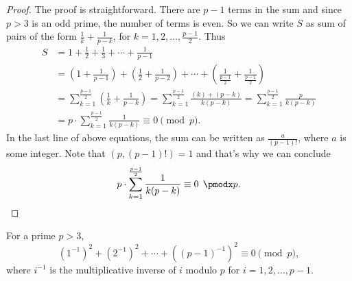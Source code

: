 \documentclass[12pt]{subfile}
\begin{document}
		\begin{proof}
			The proof is straightforward. There are $p-1$ terms in the sum and since $p>3$ is an odd prime, the number of terms is even. So we can write $S$ as sum of pairs of the form $ \frac{1}{k} +‌\frac{1}{p-k}$, for $k=1, 2, \ldots, \frac{p-1}{2}$. Thus
			\begin{align*}
				S &= 1+\frac{1}{2}+ \frac{1}{3}+\cdots+ \frac{1}{p-1}\\
				&= \left(1 + \frac{1}{p-1}\right) +‌\left(\frac{1}{2} + \frac{1}{p-2}\right) + \cdots + \left(\frac{1}{\frac{p-1}{2}} + \frac{1}{\frac{p-1}{2}}\right)\\
				&= \sum_{k=1}^{\frac{p-1}{2}} \left(\frac{1}{k}+\frac{1}{p-k} \right) = \sum_{k=1}^{\frac{p-1}{2}} \frac{(k) + (p-k)}{k(p-k)} = \sum_{k=1}^{\frac{p-1}{2}} \frac{p}{k(p-k)}\\
				&=p \cdot \sum_{k=1}^{\frac{p-1}{2}} \frac{1}{k(p-k)} \equiv 0 \pmod p.
			\end{align*}
			In the last line of above equations, the sum can be written as $\frac{a}{(p-1)!}$, where $a$ is some integer. Note that $(p, (p-1)!)=1$ and that's why we can conclude
				\begin{equation*}
					p \cdot \sum_{k=1}^{\frac{p-1}{2}} \frac{1}{k(p-k)} \equiv 0 \pmod p. \qedhere
				\end{equation*}
		\end{proof}
		
		\begin{lemma}\label{lem:wolstproof2} For a prime $p>3$,
			\[(1^{-1})^2+(2^{-1})^2+\cdots+((p-1)^{-1})^2 \equiv 0 \pmod p,\] where $i^{-1}$ is the multiplicative inverse of $i$ modulo $p$ for $i=1,2,\ldots,p-1$.
		\end{lemma}
		
\end{document}
